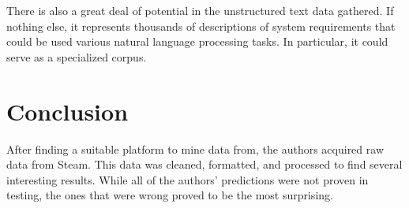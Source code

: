 \documentclass[letterpaper,10pt,twocolumn]{article}
\begin{document}
There is also a great deal of potential in the unstructured text data gathered.
If nothing else, it represents thousands of descriptions of system requirements
that could be used various natural language processing tasks. In particular, it
could serve as a specialized corpus.


\section{Conclusion}

After finding a suitable platform to mine data from, the authors acquired raw
data from Steam. This data was cleaned, formatted, and processed to find
several interesting results. While all of the authors' predictions were not
proven in testing, the ones that were wrong proved to be the most surprising.


\nocite{*}                                 %
\printbibliography

\end{document}
